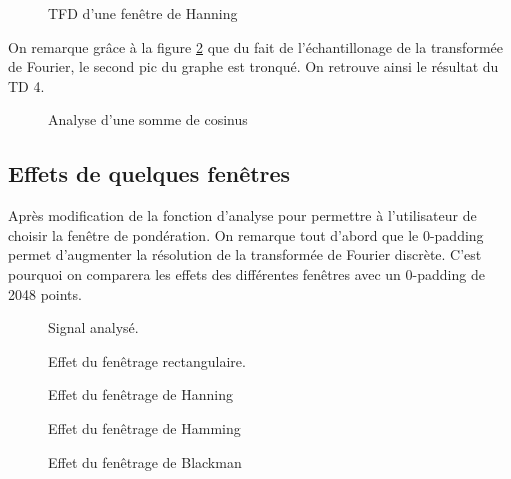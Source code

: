 \documentclass[french]{article}
\begin{document}
\begin{figure}[h!]
	\centering
	
	\caption{TFD d'une fenêtre de Hanning}
	\label{fig:hanning}
\end{figure}

On remarque grâce à la figure \ref{fig:hanning_sans_0p} que du fait de l'échantillonage de la transformée de Fourier, le second pic du graphe est tronqué. On retrouve ainsi le résultat du TD 4.

\begin{figure}[h!]
	\centering
	
	\caption{Analyse d'une somme de cosinus}
	\label{fig:hanning_sans_0p}
\end{figure}

\subsection{Effets de quelques fenêtres}

Après modification de la fonction d'analyse pour permettre à l'utilisateur de choisir la fenêtre de pondération. On remarque tout d'abord que le 0-padding permet d'augmenter la résolution de la transformée de Fourier discrète. C'est pourquoi on comparera les effets des différentes fenêtres avec un 0-padding de 2048 points.

  
\begin{figure}[h!]
	\centering
	\begin{minipage}{\textwidth}
		\centering
		
		\caption{Signal analysé.}
		\label{fig:fen_signal}
	\end{minipage}
\end{figure}
\begin{figure}[h!]
  	\begin{minipage}{\textwidth}
  		\centering
  		
  		\caption{Effet du fenêtrage rectangulaire.}
  		\label{fig:fen_rectangle}
  	\end{minipage}
  	\begin{minipage}{\textwidth}
  		\centering
  		
  		\caption{Effet du fenêtrage de Hanning}
  		\label{fig:fen_hanning}
	\end{minipage}
	\begin{minipage}{\textwidth}
		\centering
		
		\caption{Effet du fenêtrage de Hamming}
		\label{fig:fen_hamming}
	\end{minipage}
	\begin{minipage}{\textwidth}
		\centering
		
		\caption{Effet du fenêtrage de Blackman}
		\label{fig:fen_blackman}
	\end{minipage}
\end{figure}
\end{document}
